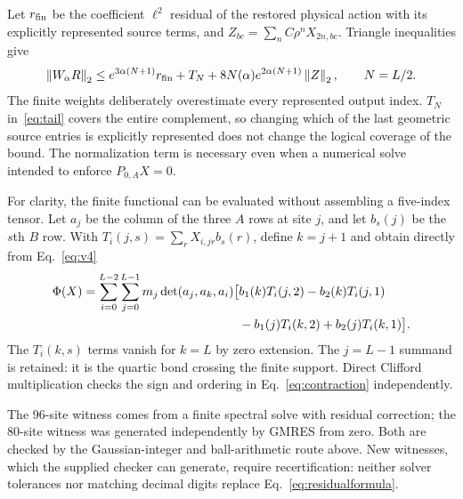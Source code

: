 \documentclass[11pt,a4paper]{article}
\newcommand{\norm}[1]{\left\lVert#1\right\rVert}
\begin{document}
Let $r_{\rm fin}$ be the coefficient $\ell^2$ residual of the restored
physical action with its explicitly represented source terms, and
$Z_{bc}=\sum_n C\rho^n X_{2n,bc}$. Triangle inequalities give
\begin{equation}
 \norm{W_\alpha R}_2\leq
 e^{3\alpha(N+1)}r_{\rm fin}+T_N
 +8N(\alpha)e^{2\alpha(N+1)}\norm{Z}_2,\qquad N=L/2.
 \label{eq:residualformula}
\end{equation}
The finite weights deliberately overestimate every represented output
index. $T_N$ in~\eqref{eq:tail} covers the entire complement, so changing
which of the last geometric source entries is explicitly represented does
not change the logical coverage of the bound. The normalization term is
necessary even when a numerical solve intended to enforce $P_{0,A}X=0$.

For clarity, the finite functional can be evaluated without assembling a
five-index tensor. Let $a_j$ be the column of the three $A$ rows at site
$j$, and let $b_s(j)$ be the $s$th $B$ row. With
$T_i(j,s)=\sum_r X_{i,jr}b_s(r)$, define $k=j+1$ and obtain directly from
Eq.~\eqref{eq:v4}
\begin{align}
 \Phi(X)=\sum_{i=0}^{L-2}\sum_{j=0}^{L-1}m_j\det(a_j,a_k,a_i)
 \bigl[&b_1(k)T_i(j,2)-b_2(k)T_i(j,1)\notag\\
       &-b_1(j)T_i(k,2)+b_2(j)T_i(k,1)\bigr].\label{eq:contraction}
\end{align}
The $T_i(k,s)$ terms vanish for $k=L$ by zero extension. The
$j=L-1$ summand is retained: it is the quartic bond crossing the finite
support. Direct Clifford multiplication checks the sign and ordering in
Eq.~\eqref{eq:contraction} independently.

The $96$-site witness comes from a finite spectral solve with residual
correction; the $80$-site witness was generated independently by GMRES from
zero. Both are checked by the Gaussian-integer and ball-arithmetic route
above. New witnesses, which the supplied checker can generate, require
recertification: neither solver tolerances nor matching decimal digits
replace Eq.~\eqref{eq:residualformula}.

\begingroup
\small
\setlength{\bibsep}{5pt}


\endgroup
\end{document}
